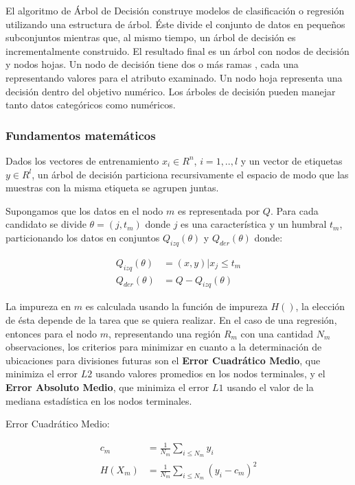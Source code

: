 El algoritmo de Árbol de Decisión construye modelos de clasificación o regresión
utilizando una estructura de árbol. Éste divide el conjunto de datos en pequeños
subconjuntos mientras que, al mismo tiempo, un árbol de decisión es incrementalmente
construido. El resultado final es un árbol con nodos de decisión y nodos hojas.
Un nodo de decisión tiene dos o más ramas , cada una representando valores para
el atributo examinado. Un nodo hoja representa una decisión dentro del
objetivo numérico. Los árboles de decisión pueden manejar tanto datos
categóricos como numéricos.

\pagebreak
\subsubsection{Fundamentos matemáticos}
Dados los vectores de entrenamiento $x_{i} \in R^{n}$, $i = 1,..,l$ y un vector
de etiquetas $y \in R^{l}$, un árbol de decisión particiona recursivamente el
espacio de modo que las muestras con la misma etiqueta se agrupen juntas.

Supongamos que los datos en el nodo $m$ es representada por $Q$. Para cada
candidato se divide $\theta = (j, t_{m})$ donde $j$ es una característica y
un humbral $t_{m}$, particionando los datos en conjuntos $Q_{izq}(\theta)$ y
$Q_{der}(\theta)$ donde:
\begin{center}
  \begin{align}
    Q_{izq}(\theta) &= (x, y) | x_{j} \leq t_m \\
    Q_{der}(\theta) &= Q - Q_{izq}(\theta)
  \end{align}
\end{center}
La impureza en $m$ es calculada usando la función de impureza $H()$, la elección
de ésta depende de la tarea que se quiera realizar.
En el caso de una regresión, entonces para el nodo $m$, representando una
región $R_{m}$ con una cantidad $N_{m}$ observaciones, los criterios
para minimizar en cuanto a la determinación de ubicaciones para divisiones
futuras son el \textbf{Error Cuadrático Medio}, que minimiza el error $L2$ usando
valores promedios en los nodos terminales, y el \textbf{Error Absoluto Medio}, que minimiza
el error $L1$ usando el valor de la mediana estadística en los nodos terminales.

Error Cuadrático Medio:

\begin{center}
  \begin{align}
    c_{m} &= \frac{1}{N_{m}} \sum_{i \leq N_{m}}^{} y_{i} \\
    H(X_{m}) &= \frac{1}{N_{m}} \sum_{i \leq N_{m}}^{} (y_{i} - c_{m})^{2}
  \end{align}
\end{center}




